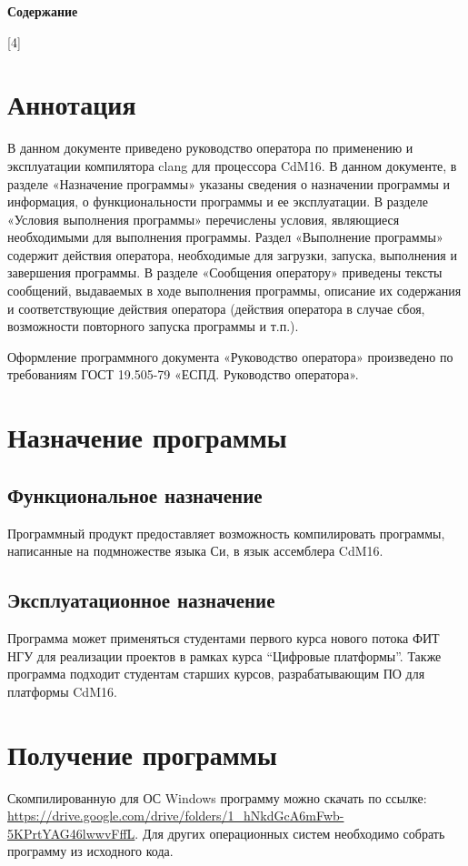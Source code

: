 \documentclass[a4paper,14pt]{extarticle}
\newcounter{IsInsideAppendixToc}
\begin{document}
\setcounter{IsInsideAppendixToc}{1}

\textbf{\Large Содержание}


\startcontents[chapters]
[4]{}

\pagebreak
\section{Аннотация}
В данном документе приведено руководство оператора по применению и эксплуатации компилятора clang для процессора CdM16. В данном документе, в разделе «Назначение программы» указаны сведения о назначении программы и информация, о функциональности программы и ее эксплуатации. В разделе «Условия выполнения программы» перечислены условия, являющиеся необходимыми для выполнения программы. Раздел «Выполнение программы» содержит действия оператора, необходимые для загрузки, запуска, выполнения и завершения программы. В разделе «Сообщения оператору» приведены тексты сообщений, выдаваемых в ходе выполнения программы, описание их содержания и соответствующие действия оператора (действия оператора в случае сбоя, возможности повторного запуска программы и т.п.).

Оформление программного документа «Руководство оператора» произведено по требованиям ГОСТ 19.505-79 «ЕСПД. Руководство оператора».

\newpage 
\section{Назначение программы}
\subsection{Функциональное назначение}
Программный продукт предоставляет возможность компилировать программы, написанные на подмножестве языка Си, в язык ассемблера CdM16.
\subsection{Эксплуатационное назначение}
Программа может применяться студентами первого курса нового потока ФИТ НГУ для реализации проектов в рамках курса “Цифровые платформы”. Также программа подходит студентам старших курсов, разрабатывающим ПО для платформы CdM16.
\section{Получение программы}
Скомпилированную для ОС Windows программу можно скачать по ссылке: \href{https://drive.google.com/drive/folders/1_hNkdGcA6mFwb-5KPrtYAG46lwwvFffL}{https://drive.google.com/drive/folders/1\_hNkdGcA6mFwb-5KPrtYAG46lwwvFffL}. Для других операционных систем необходимо собрать программу из исходного кода.
\end{document}
